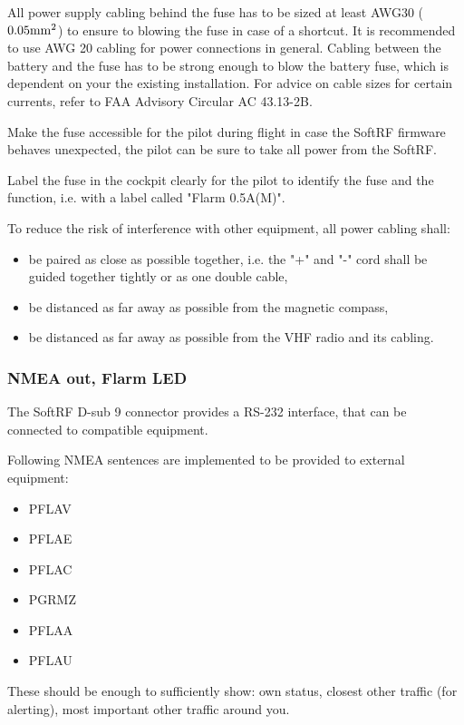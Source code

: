 \documentclass[11pt,a4paper]{article}
\begin{document}
All power supply cabling behind the fuse has to be sized at least AWG30 ($0.05 {\rm mm}^2$) to ensure to blowing the fuse in case of a shortcut. It is recommended to use AWG 20 cabling for power connections in general. Cabling between the battery and the fuse has to be strong enough to blow the battery fuse, which is dependent on your the existing installation. For advice on cable sizes for certain currents, refer to FAA Advisory Circular AC 43.13-2B.

Make the fuse accessible for the pilot during flight in case the SoftRF firmware behaves unexpected, the pilot can be sure to take all power from the SoftRF.

Label the fuse in the cockpit clearly for the pilot to identify the fuse and the function, i.e. with a label called "Flarm 0.5A(M)".

To reduce the risk of interference with other equipment, all power cabling shall:
\begin{itemize}
\item be paired as close as possible together, i.e. the "+" and "-" cord shall be guided together tightly or as one double cable,
\item be distanced as far away as possible from the magnetic compass,
\item be distanced as far away as possible from the VHF radio and its cabling.
\end{itemize}

\subsubsection{NMEA out, Flarm LED}
The SoftRF D-sub 9 connector provides a RS-232 interface, that can be connected to compatible equipment.

Following NMEA sentences are implemented to be provided to external equipment:

\begin{itemize}
\item PFLAV
\item PFLAE
\item PFLAC
\item PGRMZ
\item PFLAA
\item PFLAU
\end{itemize}

These should be enough to sufficiently show: own status, closest other traffic (for alerting), most important other traffic around you.
\end{document}
